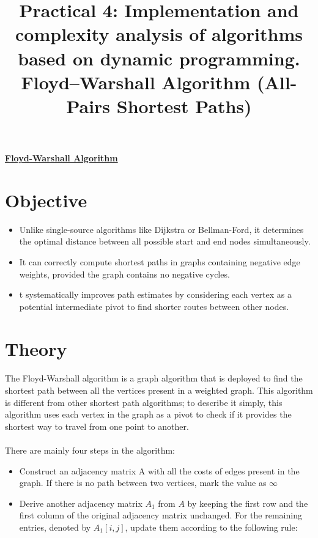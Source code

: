 \documentclass{article}
\author{}
\date{}
\title{\textbf{Practical 4: Implementation and
complexity analysis of
algorithms based on dynamic
programming.
Floyd–Warshall Algorithm
(All-Pairs Shortest Paths)}}
\begin{document}
\maketitle

\vspace{0.1mm}
\begin{center}
    \LARGE\textbf{\underline{Floyd-Warshall Algorithm}}
\end{center}


{\normalsize
\section*{Objective}
\begin{itemize}
    \item Unlike single-source algorithms like Dijkstra or Bellman-Ford, it determines the optimal distance between all possible start and end nodes simultaneously.
    \item It can correctly compute shortest paths in graphs containing negative edge weights, provided the graph contains no negative cycles.
    \item t systematically improves path estimates by considering each vertex as a potential intermediate pivot to find shorter routes between other nodes. 
\end{itemize}

\section*{Theory}
\paragraph{} 
The Floyd-Warshall algorithm is a graph algorithm that is deployed to find the shortest path between all the vertices present in a weighted graph. This algorithm is different from other shortest path algorithms; to describe it simply, this algorithm uses each vertex in the graph as a pivot to check if it provides the shortest way to travel from one point to another.
\paragraph{}
There are mainly four steps in the algorithm:
\begin{itemize}
    \item Construct an adjacency matrix A with all the costs of edges present in the graph. If there is no path between two vertices, mark the value as $\infty$
    \item Derive another adjacency matrix $A_1$ from $A$ by keeping the first row and the first column of the original adjacency matrix unchanged. For the remaining entries, denoted by $A_1[i,j]$, update them according to the following rule:


\end{itemize}}
\end{document}
